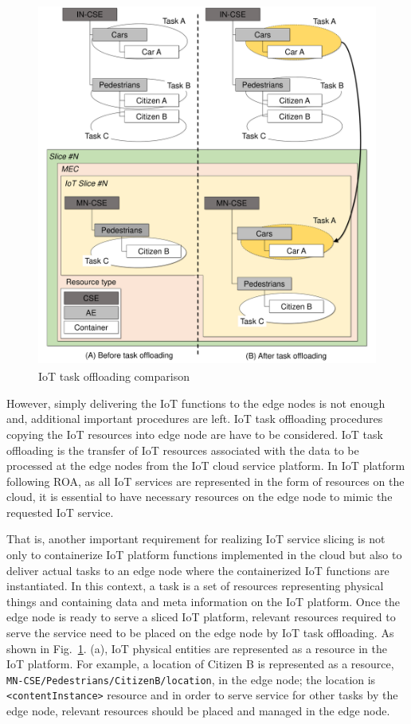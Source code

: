 \begin{figure}[tb!]
\centering
\includegraphics[width=\textwidth, height=12cm]{figures/fig_IoT_slicing_resource_offloading_edge.pdf}
\caption{IoT task offloading comparison}
\label{fig:iot_task_offloading_comparison}
\end{figure}

However, simply delivering the IoT functions to the edge nodes is not enough and, additional important procedures are left. IoT task offloading procedures copying the IoT resources into edge node are have to be considered. IoT task offloading is the transfer of IoT resources associated with the data to be processed at the edge nodes from the IoT cloud service platform. In IoT platform following ROA, as all IoT services are represented in the form of resources on the cloud, it is essential to have necessary resources on the edge node to mimic the requested IoT service.

That is, another important requirement for realizing IoT service slicing is not only to containerize IoT platform functions implemented in the cloud but also to deliver actual tasks to an edge node where the containerized IoT functions are instantiated. In this context, a task is a set of resources representing physical things and containing data and meta information on the IoT platform. Once the edge node is ready to serve a sliced IoT platform, relevant resources required to serve the service need to be placed on the edge node by IoT task offloading. As shown in Fig.~\ref{fig:iot_task_offloading_comparison}. (a), IoT physical entities are represented as a resource in the IoT platform. For example, a location of Citizen B is represented as a resource, \texttt{MN-CSE/Pedestrians/CitizenB/location}, in the edge node; the location is \texttt{<contentInstance>} resource and in order to serve service for other tasks by the edge node, relevant resources should be placed and managed in the edge node.

